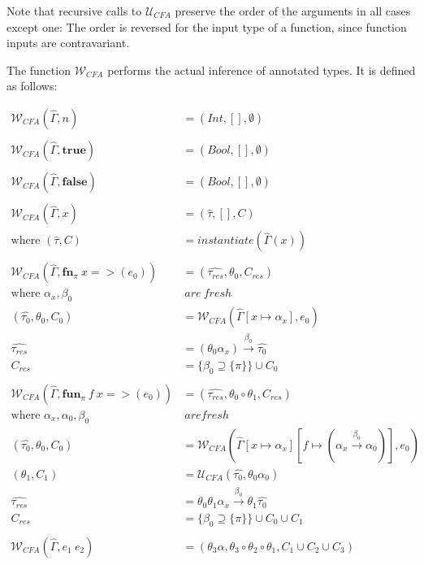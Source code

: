 \documentclass[a4paper,11pt]{article}
\newcommand{\bigU}{\ensuremath{\mathcal{U}_{CFA}}\xspace}
\newcommand{\bigW}{\ensuremath{\mathcal{W}_{CFA}}\xspace}
\begin{document}
Note that recursive calls to \bigU preserve the order of the arguments in all cases except one: The order is reversed for the input type of a function, since function inputs are contravariant.

The function \bigW performs the actual inference of annotated types. It is defined as follows:

\begin{align*}
  \bigW (\hat{\Gamma}, n) &= (Int, [], \emptyset)\\
  \\
  \bigW (\hat{\Gamma}, \textbf{true}) &= (Bool, [], \emptyset)\\
  \\
  \bigW (\hat{\Gamma}, \textbf{false}) &= (Bool, [], \emptyset)\\
  \\
  \bigW (\hat{\Gamma}, x) &= (\hat{\tau}, [], C)\\ 
  \text{where }(\hat{\tau}, C) &= instantiate (\hat{\Gamma}(x))\\
  \\
  \bigW (\hat{\Gamma}, \textbf{fn}_\pi ~x => (e_0)) &= (\hat{\tau_{res}}, \theta_0, C_{res})\\
  \text{where }\alpha_x, \beta_0 & ~are~fresh\\
  (\hat{\tau_0}, \theta_0, C_0) &= \bigW (\hat{\Gamma}[x \mapsto \alpha_x], e_0)\\
  \hat{\tau_{res}} &= (\theta_0 \alpha_x) \xrightarrow{\beta_0} \hat{\tau_0}\\
  C_{res} &= \{\beta_0 \supseteq \{\pi\}\} \cup C_0\\
  \\
  \bigW (\hat{\Gamma}, \textbf{fun}_\pi ~f~x => (e_0)) &= (\hat{\tau_{res}}, \theta_0 \circ \theta_1, C_{res})\\
  \text{where }\alpha_x, \alpha_0, \beta_0 & ~are fresh\\
  (\hat{\tau_0}, \theta_0, C_0) &= \bigW (\hat{\Gamma}[x \mapsto \alpha_x][f \mapsto (\alpha_x \xrightarrow{\beta_0} \alpha_0)], e_0)\\
  (\theta_1, C_1) &= \bigU (\hat{\tau_0}, \theta_0\alpha_0)\\
  \hat{\tau_{res}} &= \theta_0\theta_1\alpha_x \xrightarrow{\beta_0} \theta_1\hat{\tau_0}\\
  C_{res} &= \{\beta_0 \supseteq \{\pi\}\} \cup C_0 \cup C_1\\
  \\
  \bigW (\hat{\Gamma}, e_1 ~ e_2) &= (\theta_3 \alpha, \theta_3 \circ \theta_2 \circ \theta_1, C_1 \cup C_2 \cup C_3)\\

\end{align*}
\end{document}
